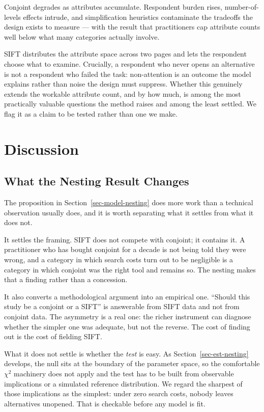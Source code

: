 \documentclass[
  letterpaper,
  DIV=11,
  numbers=noendperiod]{scrartcl}
\begin{document}
Conjoint degrades as attributes accumulate. Respondent burden rises,
number-of-levels effects intrude, and simplification heuristics
contaminate the tradeoffs the design exists to measure --- with the
result that practitioners cap attribute counts well below what many
categories actually involve.

SIFT distributes the attribute space across two pages and lets the
respondent choose what to examine. Crucially, a respondent who never
opens an alternative is not a respondent who failed the task:
non-attention is an outcome the model explains rather than noise the
design must suppress. Whether this genuinely extends the workable
attribute count, and by how much, is among the most practically valuable
questions the method raises and among the least settled. We flag it as a
claim to be tested rather than one we make.

\section{Discussion}\label{sec-discussion}

\subsection{What the Nesting Result Changes}\label{sec-disc-nesting}

The proposition in Section~\ref{sec-model-nesting} does more work than a
technical observation usually does, and it is worth separating what it
settles from what it does not.

It settles the framing. SIFT does not compete with conjoint; it contains
it. A practitioner who has bought conjoint for a decade is not being
told they were wrong, and a category in which search costs turn out to
be negligible is a category in which conjoint was the right tool and
remains so. The nesting makes that a finding rather than a concession.

It also converts a methodological argument into an empirical one.
``Should this study be a conjoint or a SIFT'' is answerable from SIFT
data and not from conjoint data. The asymmetry is a real one: the richer
instrument can diagnose whether the simpler one was adequate, but not
the reverse. The cost of finding out is the cost of fielding SIFT.

What it does not settle is whether the \emph{test} is easy. As
Section~\ref{sec-est-nesting} develops, the null sits at the boundary of
the parameter space, so the comfortable \(\chi^2\) machinery does not
apply and the test has to be built from observable implications or a
simulated reference distribution. We regard the sharpest of those
implications as the simplest: under zero search costs, nobody leaves
alternatives unopened. That is checkable before any model is fit.
\end{document}
